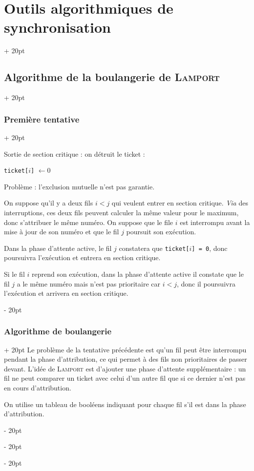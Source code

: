 \documentclass[a4paper, 12pt, twoside]{article}
\newcommand{\ind}[1][20pt]{\advance\leftskip + #1}
\newcommand{\deind}[1][20pt]{\advance\leftskip - #1}
\newenvironment{indt}[2][20pt]{#2 \par \ind[#1]}{\par \deind} %
\begin{document}
\begin{indt}{\section{Outils algorithmiques de synchronisation}}
\begin{indt}{\subsection{Algorithme de la boulangerie de \textsc{Lamport}}}
\begin{indt}{\subsubsection{Première tentative}}
\begin{pseudocode}
                    \vspace{6pt}
                    
                    Sortie de section critique : on détruit le ticket :

                    \texttt{ticket[$i$]} $\leftarrow 0$
                \end{pseudocode}

                \vspace{6pt}
                
                Problème : l'exclusion mutuelle n'est pas garantie.

                On suppose qu'il y a deux fils $i < j$ qui veulent entrer en section critique.
                \textit{Via} des interruptions, ces deux fils peuvent calculer la même valeur pour le maximum, donc s'attribuer le même numéro.
                On suppose que le file $i$ est interrompu avant la mise à jour de son numéro et que le fil $j$ poursuit son exécution.

                Dans la phase d'attente active, le fil $j$ constatera que \texttt{ticket[$i$] = 0}, donc poursuivra l'exécution et entrera en section critique.

                Si le fil $i$ reprend son exécution, dans la phase d'attente active il constate que le fil $j$ a le même numéro mais n'est pas prioritaire car $i < j$, donc il poursuivra l'exécution et arrivera en section critique.
            \end{indt}

            \vspace{12pt}
            
            \begin{indt}{\subsubsection{Algorithme de boulangerie}}
                Le problème de la tentative précédente est qu'un fil peut être interrompu pendant la phase d'attribution, ce qui permet à des fils non prioritaires de passer devant.
                L'idée de \textsc{Lamport} est d'ajouter une phase d'attente supplémentaire : un fil ne peut comparer un ticket avec celui d'un autre fil que si ce dernier n'est pas en cours d'attribution.

                \vspace{6pt}
                
                On utilise un tableau de booléens indiquant pour chaque fil s'il est dans la phase d'attribution.


\end{indt}
\end{indt}
\end{indt}
\end{document}
